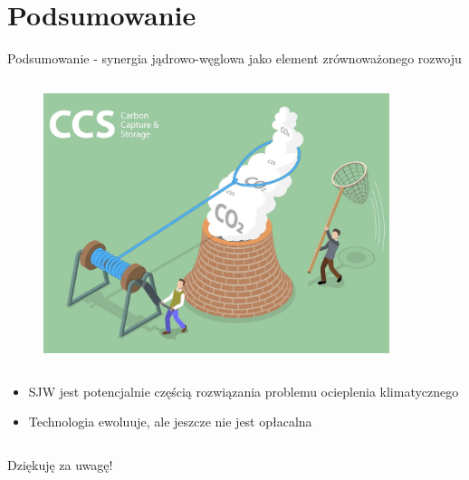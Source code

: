 \section{Podsumowanie}

\begin{columnframe}{Podsumowanie - synergia jądrowo-węglowa jako element zrównoważonego rozwoju}
    \begin{column}{0.5\textwidth}
        \begin{figure}
            \centering
            \includegraphics[width=0.9\textwidth, frame]{images/CCS_illustration_gettyimages.jpg}
        \end{figure}
    \end{column}
    \begin{column}{0.5\textwidth}
        \begin{itemize}
            \item SJW jest potencjalnie częścią rozwiązania problemu ocieplenia klimatycznego
            \item Technologia ewoluuje, ale jeszcze nie jest opłacalna
        \end{itemize}
    \end{column}
\end{columnframe}


\begin{frame}{Dziękuję za uwagę!}
\end{frame}